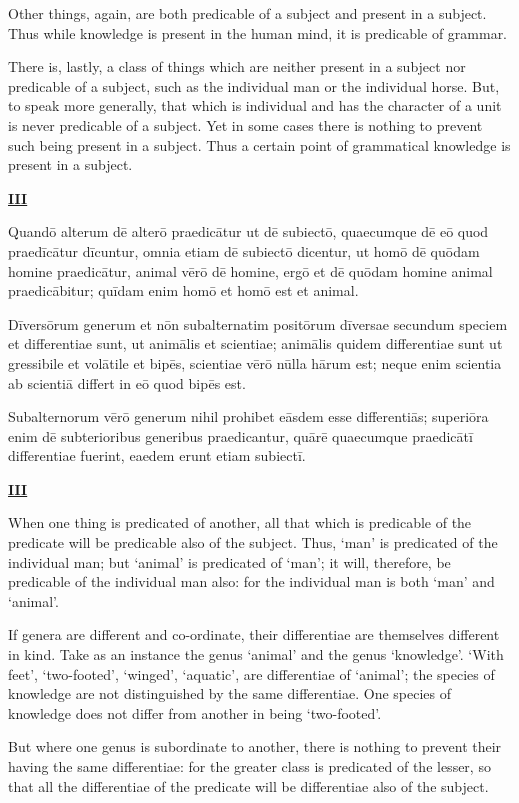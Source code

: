 \documentclass[14pt,twoside]{extbook}
\newcommand{\mktitle}[1]{%
    {\begin{center}\small\textsc{\bfseries\underline{#1}}\end{center}}}
\begin{document}
Other things, again, are both predicable of a subject and present in a subject. Thus while knowledge is present in the human mind, it is predicable of grammar.

There is, lastly, a class of things which are neither present in a subject nor predicable of a subject, such as the individual man or the individual horse. But, to speak more generally, that which is individual and has the character of a unit is never predicable of a subject. Yet in some cases there is nothing to prevent such being present in a subject. Thus a certain point of grammatical knowledge is present in a subject.\newpage

\mktitle{III}

Quandō alterum dē alterō praedicātur ut dē subiectō, quaecumque dē
eō quod praedīcātur dīcuntur, omnia etiam dē subiectō dicentur, ut
homō dē quōdam homine praedicātur, animal vērō dē homine, ergō et dē
quōdam homine animal praedicābitur; quīdam enim homō et homō est et
animal.

Dīversōrum generum et nōn subalternatim positōrum dīversae secundum
speciem et differentiae sunt, ut animālis et scientiae; animālis
quidem differentiae sunt ut gressibile et volātile et bipēs, scientiae
vērō nūlla hārum est; neque enim scientia ab scientiā differt in eō
quod bipēs est.

Subalternorum vērō generum nihil prohibet eāsdem esse
differentiās; superiōra enim dē subterioribus generibus praedicantur,
quārē quaecumque praedicātī differentiae fuerint, eaedem erunt etiam
subiectī.\newpage

\mktitle{III}

When one thing is predicated of another, all that which is predicable of the predicate will be predicable also of the subject. Thus, `man' is predicated of the individual man; but `animal' is predicated of `man'; it will, therefore, be predicable of the individual man also: for the individual man is both `man' and `animal'.

If genera are different and co-ordinate, their differentiae are themselves different in kind. Take as an instance the genus `animal' and the genus `knowledge'. `With feet', `two-footed', `winged', `aquatic', are differentiae of `animal'; the species of knowledge are not distinguished by the same differentiae. One species of knowledge does not differ from another in being `two-footed'.

But where one genus is subordinate to another, there is nothing to prevent their having the same differentiae: for the greater class is predicated of the lesser, so that all the differentiae of the predicate will be differentiae also of the subject.  \newpage
\end{document}
